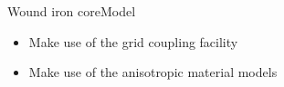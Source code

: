 %
%
%
%
%

\begin{frame}{Wound iron core}{Model}
  \begin{itemize}
  \item Make use of the grid coupling facility
  \item Make use of the anisotropic material models
  \end{itemize}
  \vfil
  \begin{minipage}{\linewidth}
    \hfil
    
    \hfil
    
    \hfil
  \end{minipage}
\end{frame}

